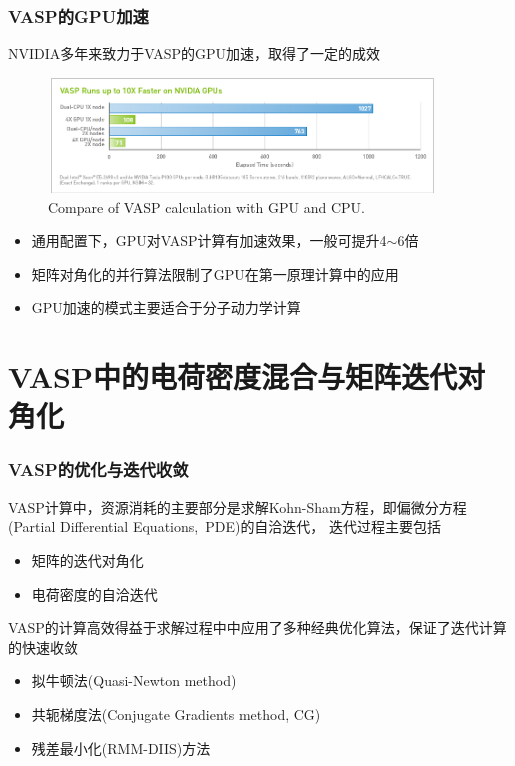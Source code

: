 \frame
{
	\frametitle{\textrm{VASP}的\textrm{GPU}加速}
\textrm{NVIDIA}多年来致力于\textrm{VASP}的\textrm{GPU}加速，取得了一定的成效
\begin{figure}[h!]
	\vspace{-0.15in}
\centering
\includegraphics[height=1.2in,width=4.05in,viewport=0 0 850 260,clip]{Figures/VASP-GPU-CPU.png}
\caption{\tiny \textrm{Compare of VASP calculation with GPU and CPU.}}%
\label{VASP_GPU}
\end{figure} 
\begin{itemize}
	\item 通用配置下，\textrm{GPU}对\textrm{VASP}计算有加速效果，一般可提升4$\sim$6倍
	\item 矩阵对角化的并行算法限制了\textrm{GPU}在第一原理计算中的应用
	\item \textrm{GPU}加速的模式主要适合于分子动力学计算
\end{itemize}
}

\section{\textrm{VASP}中的电荷密度混合与矩阵迭代对角化}
\frame
{
	\frametitle{\textrm{VASP}的优化与迭代收敛}
	\textrm{VASP}计算中，资源消耗的主要部分是求解\textrm{Kohn-Sham}方程，即偏微分方程\textrm{(Partial Differential Equations,~PDE)}的自洽迭代， 迭代过程主要包括
	\begin{itemize}
		\item 矩阵的迭代对角化
		\item 电荷密度的自洽迭代
	\end{itemize}

	\vskip 10pt
	\textrm{VASP}的计算高效得益于求解过程中中应用了多种经典优化算法，保证了迭代计算的快速收敛
	\begin{itemize} 
		\item 拟牛顿法\textrm{(Quasi-Newton method)}
		\item 共轭梯度法\textrm{(Conjugate Gradients method, CG)}
		\item 残差最小化\textrm{(RMM-DIIS)}方法
	\end{itemize}
}

